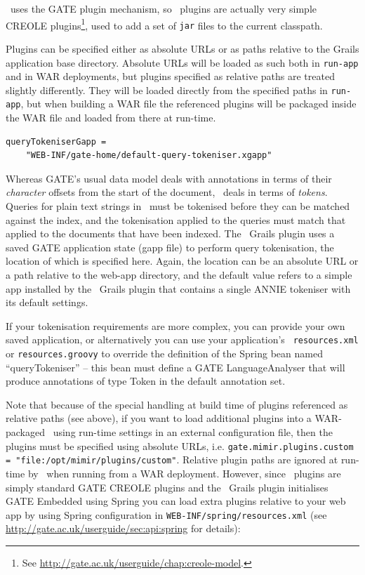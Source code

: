 \Mimir\ uses the GATE plugin mechanism, so \Mimir\ plugins are actually
very simple CREOLE plugins\footnote{See
\url{http://gate.ac.uk/userguide/chap:creole-model}.}, used to add a set of
{\tt jar} files to the current classpath.
 
Plugins can be specified either as absolute URLs or as paths relative to the
Grails application base directory.  Absolute URLs will be loaded as such both
in {\tt run-app} and in WAR deployments, but plugins specified as relative
paths are treated slightly differently.  They will be loaded directly from the
specified paths in {\tt run-app}, but when building a WAR file the referenced
plugins will be packaged inside the WAR file and loaded from there at run-time.

\begin{lstlisting}
queryTokeniserGapp = 
    "WEB-INF/gate-home/default-query-tokeniser.xgapp"
\end{lstlisting}

Whereas GATE's usual data model deals with annotations in terms of their {\em
character} offsets from the start of the document, \Mimir\ deals in terms of
{\em tokens}.  Queries for plain text strings in \Mimir\ must be tokenised
before they can be matched against the index, and the tokenisation applied to
the queries must match that applied to the documents that have been indexed.
The \Mimir\ Grails plugin uses a saved GATE application state (gapp file) to
perform query tokenisation, the location of which is specified here.  Again,
the location can be an absolute URL or a path relative to the web-app
directory, and the default value refers to a simple app installed by the
\Mimir\ Grails plugin that contains a single ANNIE tokeniser with its default
settings.

If your tokenisation requirements are more complex, you can provide your own
saved application, or alternatively you can use your application's {\tt
resources.xml} or {\tt resources.groovy} to override the definition of the
Spring bean named ``queryTokeniser'' -- this bean must define a GATE
LanguageAnalyser that will produce annotations of type Token in the default
annotation set.

Note that because of the special handling at build time of plugins referenced
as relative paths (see above), if you want to load additional plugins into a
WAR-packaged \Mimir\ using run-time settings in an external configuration file,
then the plugins must be specified using absolute URLs, i.e.
{\tt gate.mimir.plugins.custom = "file:/opt/mimir/plugins/custom"}.  Relative
plugin paths are ignored at run-time by \Mimir\ when running from a WAR
deployment.  However, since \Mimir\ plugins are simply standard GATE CREOLE
plugins and the \Mimir\ Grails plugin initialises GATE Embedded using Spring
you can load extra plugins relative to your web app by using Spring
configuration in {\tt WEB-INF/spring/resources.xml} (see
\url{http://gate.ac.uk/userguide/sec:api:spring} for details):

